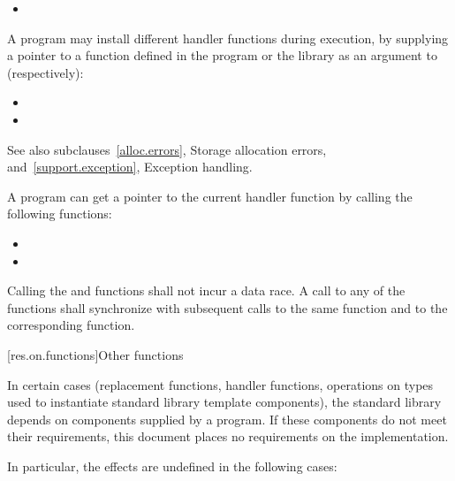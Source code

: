 \begin{itemize}
\item
{}
%
\end{itemize}

\pnum
A \Cpp{} program may install different handler functions during execution, by
supplying a pointer to a function defined in the program or the library
as an argument to (respectively):
\begin{itemize}
\item {}
\item {}
\end{itemize}
See also subclauses~\ref{alloc.errors}, Storage allocation errors, and~\ref{support.exception},
Exception handling.

\pnum
A \Cpp{} program can get a pointer to the current handler function by calling the following
functions:

\begin{itemize}
\item
{}%
\item
{}
\end{itemize}

\pnum
Calling the  and  functions shall not incur a data race. A call to
any of the  functions shall synchronize with subsequent calls to the same
 function and to the corresponding  function.

[res.on.functions]{Other functions}

\pnum
In certain cases (replacement functions, handler functions, operations on types used to
instantiate standard library template components), the \Cpp{} standard library depends on
components supplied by a \Cpp{} program.
If these components do not meet their requirements, this document places no requirements
on the implementation.

\pnum
In particular, the effects are undefined in the following cases:

